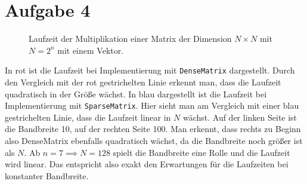 \documentclass{article}
\theoremstyle{definition}
\begin{document}
\section*{Aufgabe 4}
\begin{figure}[h]
    \caption{Laufzeit der Multiplikation einer Matrix der Dimension $N \times N$ mit $N = 2^n$ mit einem Vektor. }
\end{figure}
In rot ist die Laufzeit bei Implementierung mit \lstinline{DenseMatrix} dargestellt. Durch den Vergleich mit der rot gestrichelten Linie erkennt man, dass die Laufzeit quadratisch in der Größe wächst. In blau dargestellt ist die Laufzeit bei Implementierung mit \lstinline{SparseMatrix}. Hier sieht man am Vergleich mit einer blau gestrichelten Linie, dass die Laufzeit linear in $N$ wächst. Auf der linken Seite ist die Bandbreite 10, auf der rechten Seite 100. Man erkennt, dass rechts zu Beginn also DenseMatrix ebenfalls quadratisch wächst, da die Bandbreite noch größer ist als $N$. Ab $n = 7 \implies N = 128$ spielt die Bandbreite eine Rolle und die Laufzeit wird linear. Das entspricht also exakt den Erwartungen für die Laufzeiten bei konstanter Bandbreite.
\end{document}

